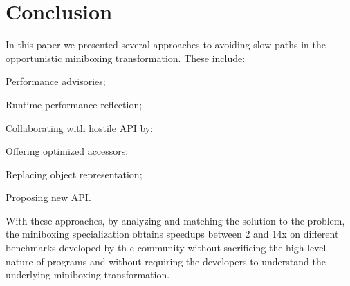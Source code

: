 \section{Conclusion}

In this paper we presented several approaches to avoiding slow paths in the opportunistic miniboxing transformation. These include:

\begin{compactitem}
  \item Performance advisories;
  \item Runtime performance reflection;
  \item Collaborating with hostile API by:
  \begin{compactitem}
    \item Offering optimized accessors;
    \item Replacing object representation;
    \item Proposing new API.
  \end{compactitem}
\end{compactitem}

With these approaches, by analyzing and matching the solution to the problem, the miniboxing specialization obtains speedups between 2 and 14x on different benchmarks developed by th  e community without sacrificing the high-level nature of programs and without requiring the developers to understand the underlying miniboxing transformation.